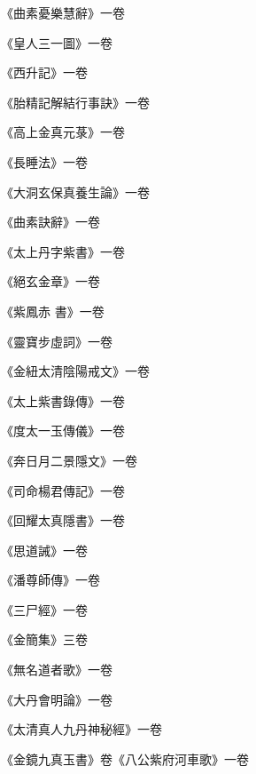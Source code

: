 \begin{pinyinscope}
 《曲素憂樂慧辭》一卷



 《皇人三一圖》一卷



 《西升記》一卷



 《胎精記解結行事訣》一卷



 《高上金真元菉》一卷



 《長睡法》一卷



 《大洞玄保真養生論》一卷



 《曲素訣辭》一卷



 《太上丹字紫書》一卷



 《絕玄金章》一卷



 《紫鳳赤
 書》一卷



 《靈寶步虛詞》一卷



 《金紐太清陰陽戒文》一卷



 《太上紫書錄傳》一卷



 《度太一玉傳儀》一卷



 《奔日月二景隱文》一卷



 《司命楊君傳記》一卷



 《回耀太真隱書》一卷



 《思道誡》一卷



 《潘尊師傳》一卷



 《三尸經》一卷



 《金簡集》三卷



 《無名道者歌》一卷



 《大丹會明論》一卷



 《太清真人九丹神秘經》一卷



 《金鏡九真玉書》卷《八公紫府河車歌》一卷




\end{pinyinscope}
